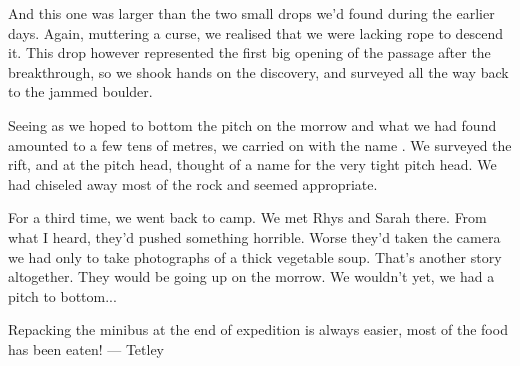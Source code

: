 And this one was larger than the two small drops we'd found during the earlier days. Again, muttering a curse, we realised that we were lacking rope to descend it. This drop however represented the first big opening of the passage after the breakthrough, so we shook hands on the discovery, and surveyed all the way back to the jammed boulder.

Seeing as we hoped to bottom the pitch on the morrow and what we had found amounted to a few tens of metres, we carried on with the name . We surveyed the rift, and at the pitch head, thought of a name for the very tight pitch head. We had chiseled away most of the rock and  seemed appropriate.

For a third time, we went back to camp. We met Rhys and Sarah there. From what I heard, they'd pushed something horrible. Worse they'd taken the camera we had only to take photographs of a thick vegetable soup. That's another story altogether. They would be going up on the morrow. We wouldn't yet, we had a pitch to bottom...

\begin{marginfigure}
\label{packing the bus}
\caption{Repacking the minibus at the end of expedition is always easier, most of the food has been eaten!  --- Tetley}
\end{marginfigure}


